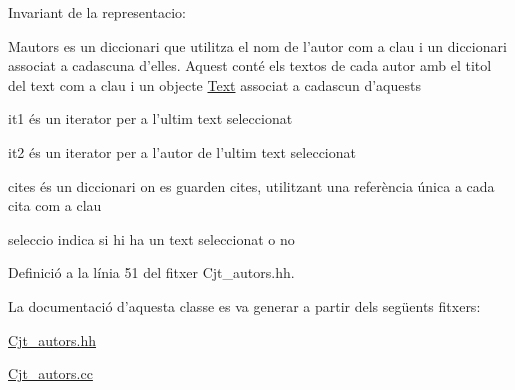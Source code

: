 Invariant de la representacio\+: 


\begin{DoxyItemize}
\item Mautors es un diccionari que utilitza el nom de l'autor com a clau i un diccionari associat a cadascuna d'elles. Aquest conté els textos de cada autor amb el titol del text com a clau i un objecte \hyperlink{class_text}{Text} associat a cadascun d'aquests
\item it1 és un iterator per a l'ultim text seleccionat
\item it2 és un iterator per a l'autor de l'ultim text seleccionat
\item cites és un diccionari on es guarden cites, utilitzant una referència única a cada cita com a clau
\item seleccio indica si hi ha un text seleccionat o no 
\end{DoxyItemize}

Definició a la línia 51 del fitxer Cjt\+\_\+autors.\+hh.



La documentació d'aquesta classe es va generar a partir dels següents fitxers\+:\begin{DoxyCompactItemize}
\item 
\hyperlink{_cjt__autors_8hh}{Cjt\+\_\+autors.\+hh}\item 
\hyperlink{_cjt__autors_8cc}{Cjt\+\_\+autors.\+cc}\end{DoxyCompactItemize}
